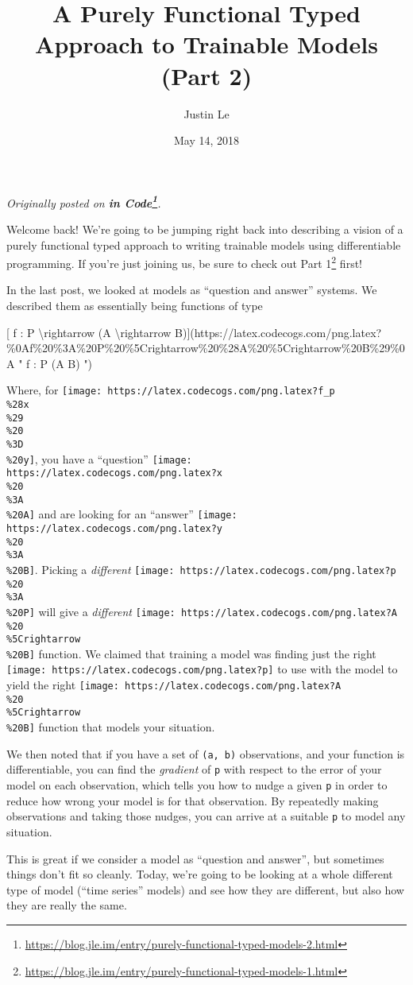 \documentclass[]{article}
\title{A Purely Functional Typed Approach to Trainable Models (Part 2)}
\author{Justin Le}
\date{May 14, 2018}
\renewcommand{\href}[2]{#2\footnote{\url{#1}}}
\begin{document}
\maketitle

\emph{Originally posted on
\textbf{\href{https://blog.jle.im/entry/purely-functional-typed-models-2.html}{in
Code}}.}

Welcome back! We're going to be jumping right back into describing a vision of a
purely functional typed approach to writing trainable models using
differentiable programming. If you're just joining us, be sure to check out
\href{https://blog.jle.im/entry/purely-functional-typed-models-1.html}{Part 1}
first!

In the last post, we looked at models as ``question and answer'' systems. We
described them as essentially being functions of type

{[} f : P \textbackslash{}rightarrow (A \textbackslash{}rightarrow
B){]}(https://latex.codecogs.com/png.latex?\%0Af\%20\%3A\%20P\%20\%5Crightarrow\%20\%28A\%20\%5Crightarrow\%20B\%29\%0A
" f : P \rightarrow (A \rightarrow B) ")

Where, for
\texttt{[image: https://latex.codecogs.com/png.latex?f\_p\\\%28x\\\%29\\\%20\\\%3D\\\%20y]},
you have a ``question''
\texttt{[image: https://latex.codecogs.com/png.latex?x\\\%20\\\%3A\\\%20A]} and are
looking for an ``answer''
\texttt{[image: https://latex.codecogs.com/png.latex?y\\\%20\\\%3A\\\%20B]}. Picking a
\emph{different}
\texttt{[image: https://latex.codecogs.com/png.latex?p\\\%20\\\%3A\\\%20P]} will give
a \emph{different}
\texttt{[image: https://latex.codecogs.com/png.latex?A\\\%20\\\%5Crightarrow\\\%20B]}
function. We claimed that training a model was finding just the right
\texttt{[image: https://latex.codecogs.com/png.latex?p]} to use with the model
to yield the right
\texttt{[image: https://latex.codecogs.com/png.latex?A\\\%20\\\%5Crightarrow\\\%20B]}
function that models your situation.

We then noted that if you have a set of \texttt{(a,\ b)} observations, and your
function is differentiable, you can find the \emph{gradient} of \texttt{p} with
respect to the error of your model on each observation, which tells you how to
nudge a given \texttt{p} in order to reduce how wrong your model is for that
observation. By repeatedly making observations and taking those nudges, you can
arrive at a suitable \texttt{p} to model any situation.

This is great if we consider a model as ``question and answer'', but sometimes
things don't fit so cleanly. Today, we're going to be looking at a whole
different type of model (``time series'' models) and see how they are different,
but also how they are really the same.
\end{document}

